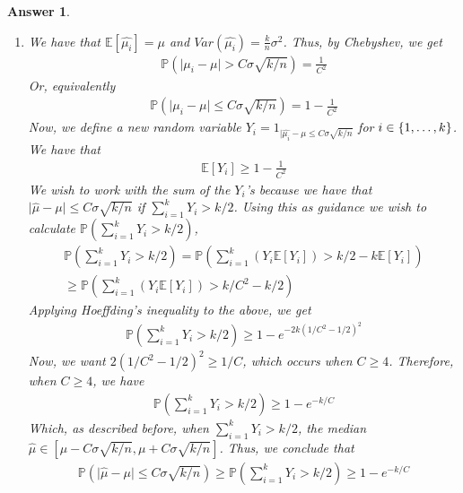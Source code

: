 \documentclass[12pt]{article}
\theoremstyle{colon}
\newtheorem*{answer}{Answer}
\begin{document}
\begin{answer}
\begin{enumerate}[label=\arabic*)]
    \item We have that $\mathbb{E}[\hat{\mu_i}] = \mu$ and $Var(\hat{\mu_i}) = \frac{k}{n} \sigma^2$. Thus, by Chebyshev, we get
      \begin{gather*}
        \mathbb{P}( \lvert \mu_i - \mu \rvert > C \sigma \sqrt{k/n}) = \frac{1}{C^2}
      \end{gather*}
      Or, equivalently
      \begin{gather*}
        \mathbb{P}( \lvert \mu_i - \mu \rvert \leq C \sigma \sqrt{k/n}) = 1 - \frac{1}{C^2}
      \end{gather*}
      Now, we define a new random variable $Y_i = 1_{\lvert \hat{\mu_i} - \mu \leq C \sigma \sqrt{k/n}}$ for $i \in \{1,\mathellipsis, k\}$. We have that
      \begin{gather*}
        \mathbb{E}[Y_i] \geq 1 - \frac{1}{C^2}
      \end{gather*}
      We wish to work with the sum of the $Y_i$'s because we have that $\lvert \hat{\mu} - \mu \rvert \leq C \sigma \sqrt{k/n}$ if $\sum_{i=1}^k Y_i > k/2$. Using this as guidance we wish to calculate $\mathbb{P}(\sum_{i=1}^k Y_i > k/2)$,
      \begin{gather*}
        \mathbb{P}(\sum_{i=1}^k Y_i > k/2) = \mathbb{P}(\sum_{i=1}^k (Y_i \mathbb{E}[Y_i]) > k/2 - k\mathbb{E}[Y_i]) \\
        \geq \mathbb{P}(\sum_{i=1}^k (Y_i \mathbb{E}[Y_i]) > k/C^2 - k/2)
      \end{gather*}
      Applying Hoeffding's inequality to the above, we get
      \begin{gather*}
        \mathbb{P}(\sum_{i=1}^k Y_i > k/2) \geq 1 - e^{-2k(1/C^2 - 1/2)^2}
      \end{gather*}
      Now, we want $2 (1/C^2 - 1/2)^2 \geq 1/C$, which occurs when $C \geq 4$. Therefore, when $C \geq 4$, we have
      \begin{gather*}
        \mathbb{P}(\sum_{i=1}^k Y_i > k/2) \geq 1 - e^{-k/C}
      \end{gather*}
      Which, as described before, when $\sum_{i=1}^k Y_i > k/2$, the median $\hat{\mu} \in [\mu - C \sigma \sqrt{k/n}, \mu + C \sigma \sqrt{k/n}]$. Thus, we conclude that
      \begin{gather*}
        \mathbb{P}(\lvert \hat{\mu} - \mu \rvert \leq C \sigma \sqrt{k/n}) \geq \mathbb{P}(\sum_{i=1}^k Y_i > k/2) \geq 1 - e^{-k/C}
      \end{gather*}
  \end{enumerate}
\end{answer}
\end{document}
